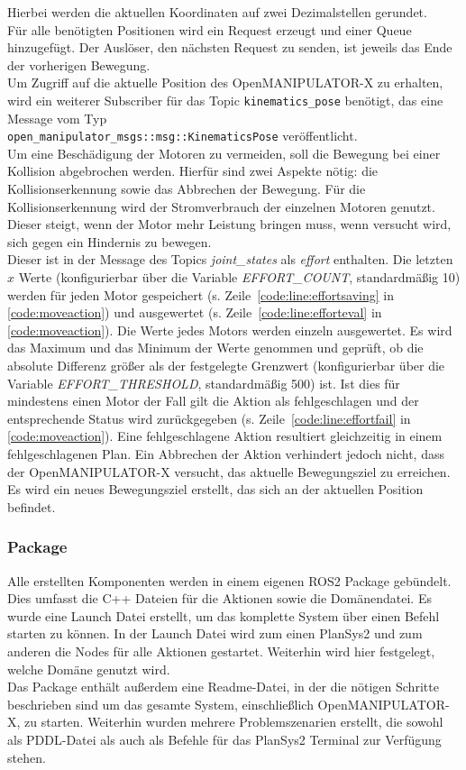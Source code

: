 Hierbei werden die aktuellen Koordinaten auf zwei Dezimalstellen gerundet.\\
Für alle benötigten Positionen wird ein Request erzeugt und einer Queue hinzugefügt.
Der Auslöser, den nächsten Request zu senden, ist jeweils das Ende der vorherigen Bewegung.\\
Um Zugriff auf die aktuelle Position des OpenMANIPULATOR-X zu erhalten, wird ein weiterer Subscriber für das Topic \verb|kinematics_pose| benötigt, das eine Message vom Typ\\
\verb|open_manipulator_msgs::msg::KinematicsPose| veröffentlicht.\\
Um eine Beschädigung der Motoren zu vermeiden, soll die Bewegung bei einer Kollision abgebrochen werden.
Hierfür sind zwei Aspekte nötig: die Kollisionserkennung sowie das Abbrechen der Bewegung.
Für die Kollisionserkennung wird der Stromverbrauch der einzelnen Motoren genutzt.
Dieser steigt, wenn der Motor mehr Leistung bringen muss, wenn versucht wird, sich gegen ein Hindernis zu bewegen.\\
Dieser ist in der Message des Topics \emph{joint\_states} als \emph{effort} enthalten.
Die letzten $x$ Werte (konfigurierbar über die Variable \emph{EFFORT\_COUNT}, standardmäßig 10) werden für jeden Motor gespeichert (s. Zeile~\ref{code:line:effortsaving} in \ref{code:moveaction}) und ausgewertet (s. Zeile~\ref{code:line:efforteval} in \ref{code:moveaction}).
Die Werte jedes Motors werden einzeln ausgewertet.
Es wird das Maximum und das Minimum der Werte genommen und geprüft, ob die absolute Differenz größer als der festgelegte Grenzwert (konfigurierbar über die Variable \emph{EFFORT\_THRESHOLD}, standardmäßig 500) ist.
Ist dies für mindestens einen Motor der Fall gilt die Aktion als fehlgeschlagen und der entsprechende Status wird zurückgegeben (s. Zeile~\ref{code:line:effortfail} in \ref{code:moveaction}).
Eine fehlgeschlagene Aktion resultiert gleichzeitig in einem fehlgeschlagenen Plan.
Ein Abbrechen der Aktion verhindert jedoch nicht, dass der OpenMANIPULATOR-X versucht, das aktuelle Bewegungsziel zu erreichen.
Es wird ein neues Bewegungsziel erstellt, das sich an der aktuellen Position befindet.


\subsubsection{Package}
Alle erstellten Komponenten werden in einem eigenen \ac{ROS2} Package gebündelt.
Dies umfasst die C++ Dateien für die Aktionen sowie die Domänendatei.
Es wurde eine Launch Datei erstellt, um das komplette System über einen Befehl starten zu können.
In der Launch Datei wird zum einen \ac{PlanSys2} und zum anderen die Nodes für alle Aktionen gestartet.
Weiterhin wird hier festgelegt, welche Domäne genutzt wird.\\
Das Package enthält außerdem eine Readme-Datei, in der die nötigen Schritte beschrieben sind um das gesamte System, einschließlich OpenMANIPULATOR-X, zu starten.
Weiterhin wurden mehrere Problemszenarien erstellt, die sowohl als \ac{PDDL}-Datei als auch als Befehle für das \ac{PlanSys2} Terminal zur Verfügung stehen.

